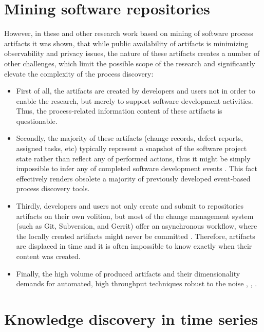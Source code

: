 \section{Mining software repositories}
However, in these and other research work based on mining of software process artifacts it was shown, 
that while public availability of artifacts is minimizing observability and privacy issues, the nature 
of these artifacts creates a number of other challenges, which limit the possible scope of the research 
and significantly elevate the complexity of the process discovery:
\begin{itemize}
\item First of all, the artifacts are created by developers and users not in order to enable the research,
but merely to support software development activities. Thus, the process-related information content of these
artifacts is questionable.
\item Secondly, the majority of these artifacts (change records, defect reports, assigned tasks, etc) 
typically represent a snapshot of the software project state rather than reflect any of performed actions, 
thus it might be simply impossible to infer any of completed software development events \cite{citeulike:1296888}.
This fact effectively renders obsolete a majority of previously developed event-based process discovery tools.
\item Thirdly, developers and users not only create and submit to repositories artifacts on their own volition,
but most of the change management system (such as Git, Subversion, and Gerrit) offer an asynchronous workflow, 
where the locally created artifacts might never be committed \cite{citeulike:2280690} \cite{citeulike:9037939}. 
Therefore, artifacts are displaced in time and it is often impossible to know exactly when their content was created.
\item Finally, the high volume of produced artifacts and their dimensionality demands for automated, high throughput 
techniques robust to the noise \cite{citeulike:12550438}, \cite{citeulike:7853299}, \cite{citeulike:4534888}.
\end{itemize}

\section{Knowledge discovery in time series}
